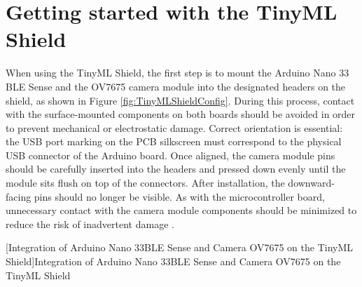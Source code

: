 %
%

\chapter{Getting started with the TinyML Shield}

When using the TinyML Shield, the first step is to mount the Arduino Nano 33 BLE Sense and the OV7675 camera module into the designated headers on the shield, as shown in Figure \ref{fig:TinyMLShieldConfig}. During this process, contact with the surface-mounted components on both boards should be avoided in order to prevent mechanical or electrostatic damage. Correct orientation is essential: the USB port marking on the PCB silkscreen must correspond to the physical USB connector of the Arduino board. Once aligned, the camera module pins should be carefully inserted into the headers and pressed down evenly until the module sits flush on top of the connectors. After installation, the downward-facing pins should no longer be visible. As with the microcontroller board, unnecessary contact with the camera module components should be minimized to reduce the risk of inadvertent damage \cite{ICTP:2022}.


\begin{center}
	[Integration of Arduino Nano 33BLE Sense and Camera OV7675 on the TinyML Shield]{Integration of Arduino Nano 33BLE Sense and Camera OV7675 on the TinyML Shield}\label{fig:TinyMLShieldConfig}
\end{center}

